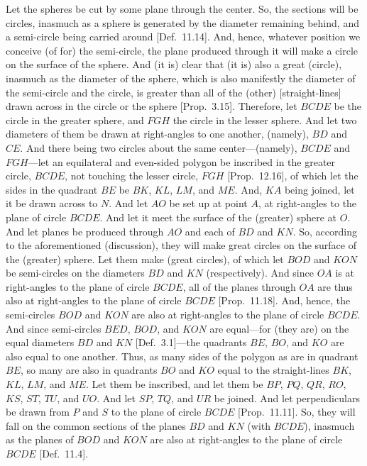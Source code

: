 \begin{Parallel}{}{}
{Let the spheres be cut by some plane through the center. So, the sections will be circles, inasmuch as a sphere is generated by  the diameter remaining behind,
and a semi-circle being carried around [Def.~11.14]. And, hence,  whatever position we
conceive  (of for) the semi-circle, the  plane produced through it will  make a circle on the surface of the sphere. And (it is) clear
that (it is) also a great (circle), inasmuch as the diameter of the sphere, which is also manifestly the  diameter of  the semi-circle
and the circle, is greater than  all of the (other)  [straight-lines] drawn across in the circle or the sphere [Prop.~3.15]. Therefore, let $BCDE$ be the circle in the greater sphere, and $FGH$ the circle in the lesser sphere. And let two diameters of them be drawn
at right-angles to one another, (namely), $BD$ and $CE$. And there being two circles about the same center---(namely), $BCDE$
and $FGH$---let an equilateral and even-sided polygon be inscribed in the greater circle, $BCDE$, not touching the
lesser circle, $FGH$ [Prop.~12.16], of which let the sides in the quadrant $BE$ be
$BK$, $KL$, $LM$, and $ME$. And, $KA$ being joined, let it be drawn across to $N$. And let $AO$ be
set up at point $A$, at right-angles to the plane of circle $BCDE$. And let it meet the surface of the (greater) sphere at $O$. 
And let planes be produced through  $AO$ and each of $BD$  and $KN$. So, according to the aforementioned (discussion),
they will make great circles on the surface of the (greater) sphere. Let them make (great circles), of which let $BOD$ and $KON$
be semi-circles on the diameters $BD$ and $KN$ (respectively). And since $OA$ is at right-angles
to the plane of circle $BCDE$,  all of the planes through $OA$ are thus also at right-angles to the plane of circle $BCDE$
[Prop.~11.18]. And, hence, the semi-circles $BOD$ and $KON$ are also at right-angles to the
plane of circle $BCDE$. And since semi-circles $BED$, $BOD$, and $KON$ are equal---for (they are) on the
equal diameters $BD$ and $KN$ [Def.~3.1]---the quadrants $BE$, $BO$, and $KO$ are also equal to one another. Thus, as many
sides of the polygon as are in quadrant $BE$, so many are also in quadrants $BO$ and $KO$ equal to the straight-lines
$BK$, $KL$, $LM$, and $ME$. Let them be inscribed, and let them be $BP$, $PQ$, $QR$, $RO$, $KS$,
$ST$, $TU$, and $UO$. And let $SP$, $TQ$, and $UR$ be joined. And let perpendiculars be drawn from
$P$ and $S$ to the plane of circle $BCDE$ [Prop.~11.11]. So, they will fall on the common sections of the planes $BD$ and $KN$ (with $BCDE$),
inasmuch as the planes of $BOD$ and $KON$ are also at right-angles to the plane of circle $BCDE$ [Def.~11.4].
}
\end{Parallel}

